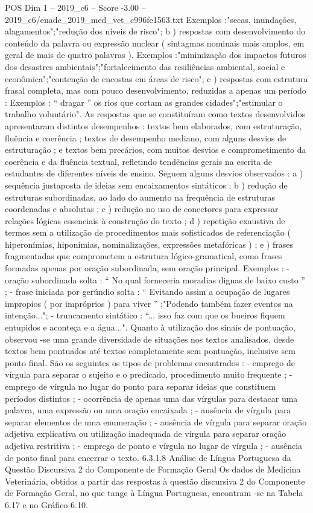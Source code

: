 \begin{textsample}{POS Dim 1 – 2019\_c6 – Score -3.00 – 2019\_c6/enade\_2019\_med\_vet\_c996fe1563.txt}
Exemplos :"secas, inundações, alagamentos";"redução dos níveis de risco"; b ) respostas com desenvolvimento do conteúdo da palavra ou expressão nuclear ( sintagmas nominais mais amplos, em geral de mais de quatro palavras ).
Exemplos :"minimização dos impactos futuros dos desastres ambientais";"fortalecimento das resiliências ambiental, social e econômica";"contenção de encostas em áreas de risco"; c ) respostas com estrutura frasal completa, mas com pouco desenvolvimento, reduzidas a apenas um período : Exemplos : “ dragar ” os rios que cortam as grandes cidades";"estimular o trabalho voluntário".
As respostas que se constituíram como textos desenvolvidos apresentaram distintos desempenhos : textos bem elaborados, com estruturação, fluência e coerência ; textos de desempenho mediano, com alguns desvios de estruturação ; e textos bem precários, com muitos desvios e comprometimento da coerência e da fluência textual, refletindo tendências gerais na escrita de estudantes de diferentes níveis de ensino.
Seguem alguns desvios observados : a ) sequência justaposta de ideias sem encaixamentos sintáticos ; b ) redução de estruturas subordinadas, ao lado do aumento na frequência de estruturas coordenadas e absolutas ; c ) redução no uso de conectores para expressar relações lógicas essenciais à construção do texto ; d ) repetição exaustiva de termos sem a utilização de procedimentos mais sofisticados de referenciação ( hiperonímias, hiponímias, nominalizações, expressões metafóricas ) ; e ) frases fragmentadas que comprometem a estrutura lógico-gramatical, como frases formadas apenas por oração subordinada, sem oração principal.
Exemplos : - oração subordinada solta : “ No qual forneceria moradias dignas de baixo custo ” ; - frase iniciada por gerúndio solta : “ Evitando assim a ocupação de lugares impropios ( por impróprios ) para viver ” ;"Podendo também fazer eventos na intenção..."; - truncamento sintático : “... isso faz com que os bueiros fiquem entupidos e aconteça e a água...".
Quanto à utilização dos sinais de pontuação, observou -se uma grande diversidade de situações nos textos analisados, desde textos bem pontuados até textos completamente sem pontuação, inclusive sem ponto final.
São os seguintes os tipos de problemas encontrados : - emprego de vírgula para separar o sujeito e o predicado, procedimento muito frequente ; - emprego de vírgula no lugar do ponto para separar ideias que constituem períodos distintos ; - ocorrência de apenas uma das vírgulas para destacar uma palavra, uma expressão ou uma oração encaixada ; - ausência de vírgula para separar elementos de uma enumeração ; - ausência de vírgula para separar oração adjetiva explicativa ou utilização inadequada de vírgula para separar oração adjetiva restritiva ; - emprego de ponto e vírgula no lugar de vírgula ; - ausência de ponto final para encerrar o texto. 6.3.1.8 Análise de Língua Portuguesa da Questão Discursiva 2 do Componente de Formação Geral Os dados de Medicina Veterinária, obtidos a partir das respostas à questão discursiva 2 do Componente de Formação Geral, no que tange à Língua Portuguesa, encontram -se na Tabela 6.17 e no Gráfico 6.10.

\end{textsample}
